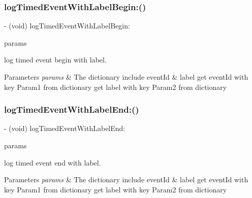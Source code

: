 \subsubsection{\texorpdfstring{log\+Timed\+Event\+With\+Label\+Begin\+:()}{logTimedEventWithLabelBegin:()}}
{\footnotesize\ttfamily -\/ (void) log\+Timed\+Event\+With\+Label\+Begin\+: \begin{DoxyParamCaption}\item[{(N\+S\+Mutable\+Dictionary$\ast$)}]{params }\end{DoxyParamCaption}}



log timed event begin with label. 


\begin{DoxyParams}{Parameters}
{\em params} & The dictionary include event\+Id \& label get event\+Id with key \textquotesingle{}Param1\textquotesingle{} from dictionary get label with key \textquotesingle{}Param2\textquotesingle{} from dictionary \\
\hline
\end{DoxyParams}
\mbox{\label{interfaceAnalyticsUmeng_a1c3dde0d83e1d6a4f40b3b39e6cde2a9}} 
\subsubsection{\texorpdfstring{log\+Timed\+Event\+With\+Label\+End\+:()}{logTimedEventWithLabelEnd:()}}
{\footnotesize\ttfamily -\/ (void) log\+Timed\+Event\+With\+Label\+End\+: \begin{DoxyParamCaption}\item[{(N\+S\+Mutable\+Dictionary$\ast$)}]{params }\end{DoxyParamCaption}}



log timed event end with label. 


\begin{DoxyParams}{Parameters}
{\em params} & The dictionary include event\+Id \& label get event\+Id with key \textquotesingle{}Param1\textquotesingle{} from dictionary get label with key \textquotesingle{}Param2\textquotesingle{} from dictionary \\
\hline
\end{DoxyParams}
\mbox{\label{interfaceAnalyticsUmeng_a4174fe428a8b275baecbe78d23ec6843}} 
